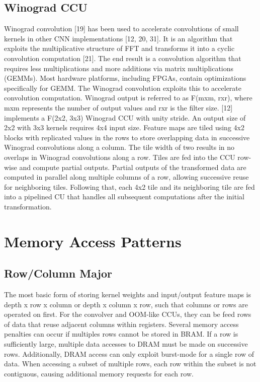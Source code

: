 \subsection{Winograd CCU}
Winograd convolution [19] has been used to accelerate convolutions of small kernels in other CNN implementations [12, 20, 31]. It is an algorithm that exploits the multiplicative structure of FFT and transforms it into a cyclic convolution computation [21]. The end result is a convolution algorithm that requires less multiplications and more additions via matrix multiplications (GEMMs). Most hardware platforms, including FPGAs, contain optimizations specifically for GEMM. The Winograd convolution exploits this to accelerate convolution computation. Winograd output is referred to as F(mxm, rxr), where mxm represents the number of output values and rxr is the filter size. [12] implements a F(2x2, 3x3) Winograd CCU with unity stride. An output size of 2x2 with 3x3 kernels requires 4x4 input size. Feature maps are tiled using 4x2 blocks with replicated values in the rows to store overlapping data in successive Winograd convolutions along a column. The tile width of two results in no overlaps in Winograd convolutions along a row. Tiles are fed into the CCU row-wise and compute partial outputs. Partial outputs of the transformed data are computed in parallel along multiple columns of a row, allowing successive reuse for neighboring tiles. Following that, each 4x2 tile and its neighboring tile are fed into a pipelined CU that handles all subsequent computations after the initial transformation.

\section{Memory Access Patterns}
\subsection{Row/Column Major}
The most basic form of storing kernel weights and input/output feature maps is depth x row x column or depth x column x row, such that columns or rows are operated on first. For the convolver and OOM-like CCUs, they can be feed rows of data that reuse adjacent columns within registers. Several memory access penalties can occur if multiples rows cannot be stored in BRAM. If a row is sufficiently large, multiple data accesses to DRAM must be made on successive rows. Additionally, DRAM access can only exploit burst-mode for a single row of data. When accessing a subset of multiple rows, each row within the subset is not contiguous, causing additional memory requests for each row.


